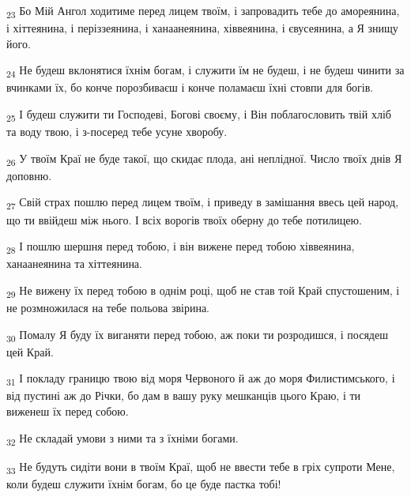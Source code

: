 \begin{tcolorbox}
\textsubscript{23} Бо Мій Ангол ходитиме перед лицем твоїм, і запровадить тебе до амореянина, і хіттеянина, і періззеянина, і ханаанеянина, хіввеянина, і євусеянина, а Я знищу його.
\end{tcolorbox}
\begin{tcolorbox}
\textsubscript{24} Не будеш вклонятися їхнім богам, і служити їм не будеш, і не будеш чинити за вчинками їх, бо конче порозбиваєш і конче поламаєш їхні стовпи для богів.
\end{tcolorbox}
\begin{tcolorbox}
\textsubscript{25} І будеш служити ти Господеві, Богові своєму, і Він поблагословить твій хліб та воду твою, і з-посеред тебе усуне хворобу.
\end{tcolorbox}
\begin{tcolorbox}
\textsubscript{26} У твоїм Краї не буде такої, що скидає плода, ані неплідної. Число твоїх днів Я доповню.
\end{tcolorbox}
\begin{tcolorbox}
\textsubscript{27} Свій страх пошлю перед лицем твоїм, і приведу в замішання ввесь цей народ, що ти ввійдеш між нього. І всіх ворогів твоїх оберну до тебе потилицею.
\end{tcolorbox}
\begin{tcolorbox}
\textsubscript{28} І пошлю шершня перед тобою, і він вижене перед тобою хіввеянина, ханаанеянина та хіттеянина.
\end{tcolorbox}
\begin{tcolorbox}
\textsubscript{29} Не вижену їх перед тобою в однім році, щоб не став той Край спустошеним, і не розмножилася на тебе польова звірина.
\end{tcolorbox}
\begin{tcolorbox}
\textsubscript{30} Помалу Я буду їх виганяти перед тобою, аж поки ти розродишся, і посядеш цей Край.
\end{tcolorbox}
\begin{tcolorbox}
\textsubscript{31} І покладу границю твою від моря Червоного й аж до моря Филистимського, і від пустині аж до Річки, бо дам в вашу руку мешканців цього Краю, і ти виженеш їх перед собою.
\end{tcolorbox}
\begin{tcolorbox}
\textsubscript{32} Не складай умови з ними та з їхніми богами.
\end{tcolorbox}
\begin{tcolorbox}
\textsubscript{33} Не будуть сидіти вони в твоїм Краї, щоб не ввести тебе в гріх супроти Мене, коли будеш служити їхнім богам, бо це буде пастка тобі!
\end{tcolorbox}
